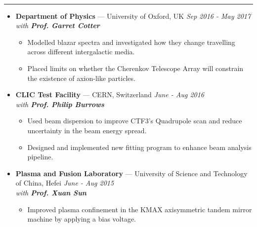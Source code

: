 \documentclass[11 pt,oneside]{article}
\newenvironment{ressection}[1]{
	\vspace{4pt}
	{\selectfont\Large\color{Mycolor2}{\textbf{#1}}}
	\vspace{-6.5pt} \\
	\textcolor{Mycolor2}{\rule{\textwidth}{0.7pt}}
	\begin{itemize}
	\vspace{3pt}
}{
	\end{itemize}
}
\newcommand{\ressubitem}{
	\vspace{-4pt}
	\item
}
\newcommand{\resbigitem}[3]{
	\vspace{-5pt}
	\item[]
	\textbf{#1} --- #2 %
	\hfill
	\textit{#3}
}
\newenvironment{ressubsec}[3]{
	\resbigitem{#1}{#2}{#3}
	\vspace{-2pt}
	\begin{itemize}
}{
	\end{itemize}
}
\begin{document}
\begin{ressection}{\textbf{Research}}
	\vspace{2pt}
	\begin{ressubsec}{Department of Physics}{University of Oxford, UK}{Sep 2016 - May 2017 \\ with \textbf{Prof. Garret Cotter}}
                 \ressubitem{Modelled blazar spectra and investigated how they change travelling across different intergalactic media.} 
                 \ressubitem{Placed limits on whether the Cherenkov Telescope Array will constrain the existence of axion-like particles.}
	\end{ressubsec}
	
	\vspace{2pt}
		
	\begin{ressubsec}{CLIC Test Facility}{CERN, Switzerland}{June - Aug 2016 \\ with \textbf{Prof. Philip Burrows}}
                 \ressubitem{Used beam dispersion to improve CTF3's Quadrupole scan and reduce uncertainty in the beam energy spread.}
                 \ressubitem{Designed and implemented new fitting program to enhance beam analysis pipeline.} 
	\end{ressubsec}
	
	\vspace{2pt}
	
	\begin{ressubsec}{Plasma and Fusion Laboratory}{University of Science and Technology of China, Hefei}{June - Aug 2015\\ with \textbf{Prof. Xuan Sun}}
                \ressubitem{Improved plasma confinement in the KMAX axisymmetric tandem mirror machine by applying a bias voltage.}
	\end{ressubsec}
	
	
	

\end{ressection}
\end{document}
